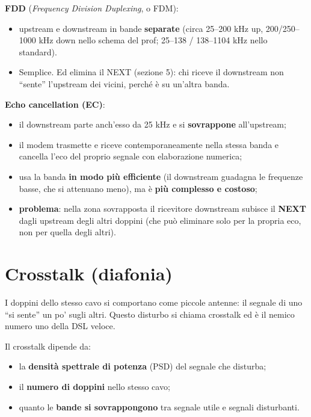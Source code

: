 \textbf{FDD} (\emph{Frequency Division Duplexing}, o FDM):

\begin{itemize}
\tightlist
\item
  upstream e downstream in bande \textbf{separate} (circa 25--200 kHz up, 200/250--1000 kHz down nello schema del prof; 25--138 / 138--1104 kHz nello standard).
\item
  Semplice. Ed elimina il NEXT (sezione 5): chi riceve il downstream non ``sente'' l'upstream dei vicini, perché è su un'altra banda.
\end{itemize}

\textbf{Echo cancellation (EC)}:

\begin{itemize}
\tightlist
\item
  il downstream parte anch'esso da 25 kHz e si \textbf{sovrappone} all'upstream;
\item
  il modem trasmette e riceve contemporaneamente nella stessa banda e cancella l'eco del proprio segnale con elaborazione numerica;
\item
  usa la banda \textbf{in modo più efficiente} (il downstream guadagna le frequenze basse, che si attenuano meno), ma è \textbf{più complesso e costoso};
\item
  \textbf{problema}: nella zona sovrapposta il ricevitore downstream subisce il \textbf{NEXT} dagli upstream degli altri doppini (che può eliminare solo per la propria eco, non per quella degli altri).
\end{itemize}

\section{Crosstalk (diafonia)}

\begin{inbreve}

I doppini dello stesso cavo si comportano come piccole antenne: il segnale di uno ``si sente'' un po' sugli altri. Questo disturbo si chiama crosstalk ed è il nemico numero uno della DSL veloce.

\end{inbreve}

Il crosstalk dipende da:

\begin{itemize}
\tightlist
\item
  la \textbf{densità spettrale di potenza} (PSD) del segnale che disturba;
\item
  il \textbf{numero di doppini} nello stesso cavo;
\item
  quanto le \textbf{bande si sovrappongono} tra segnale utile e segnali disturbanti.
\end{itemize}


